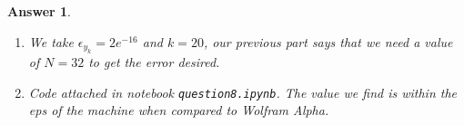 \documentclass[12pt]{article}
\theoremstyle{colon}
\newtheorem*{answer}{Answer}
\begin{document}
\begin{answer}
\begin{enumerate}[label=\alph*)]
      But, by assumption, we have $\epsilon_{y_N} = 1$, So we get
      \begin{gather*}
        \epsilon_{y_k} = \frac{k!}{N!}
      \end{gather*}

      Solving for N (using Gamma functions) will give the value of $N$ required to get the desired error.

    \item We take $\epsilon_{y_k} = 2e^{-16}$ and $k=20$, our previous part says that we need a value of $N=32$ to get the error desired.

    \item Code attached in notebook \texttt{question8.ipynb}. The value we find is within the eps of the machine when compared to Wolfram Alpha.

  \end{enumerate}
\end{answer}
\end{document}
